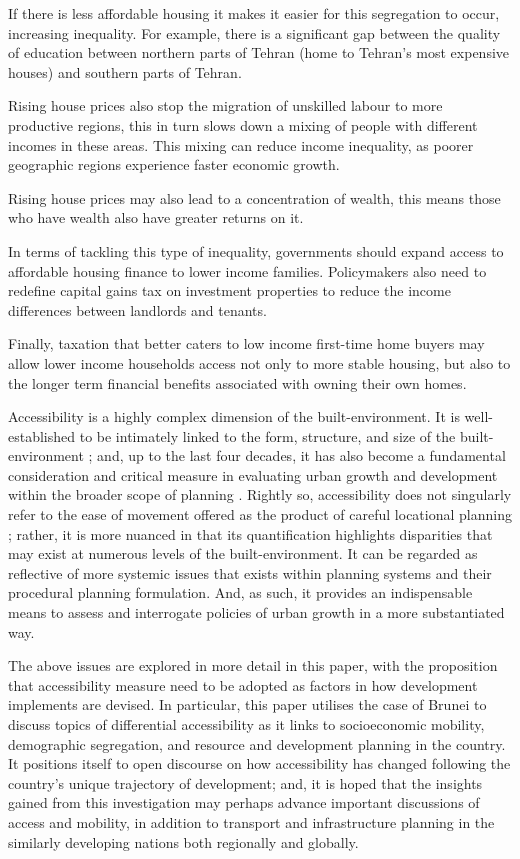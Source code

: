 If there is less affordable housing it makes it easier for this segregation to occur, increasing inequality. For example, there is a significant gap between the quality of education between northern parts of Tehran (home to Tehran’s most expensive houses) and southern parts of Tehran.

Rising house prices also stop the migration of unskilled labour to more productive regions, this in turn slows down a mixing of people with different incomes in these areas. This mixing can reduce income inequality, as poorer geographic regions experience faster economic growth.

Rising house prices may also lead to a concentration of wealth, this means those who have wealth also have greater returns on it.

In terms of tackling this type of inequality, governments should expand access to affordable housing finance to lower income families. Policymakers also need to redefine capital gains tax on investment properties to reduce the income differences between landlords and tenants.

Finally, taxation that better caters to low income first-time home buyers may allow lower income households access not only to more stable housing, but also to the longer term financial benefits associated with owning their own homes.


Accessibility is a highly complex dimension of the built-environment. It is well-established to be intimately linked to the form, structure, and size of the built-environment \citep{vickerman1974accessibility, handy1997measuring}; and, up to the last four decades, it has also become a fundamental consideration and critical measure in evaluating urban growth and development within the broader scope of planning \citep{ingram1971concept}. Rightly so, accessibility does not singularly refer to the ease of movement offered as the product of careful locational planning \citep{nelson1993assessing, gatrell1999health,van1999accessibility}; rather, it is more nuanced in that its quantification highlights disparities that may exist at numerous levels of the built-environment. It can be regarded as reflective of more systemic issues that exists within planning systems and their procedural planning formulation. And, as such, it provides an indispensable means to assess and interrogate policies of urban growth in a more substantiated way.

The above issues are explored in more detail in this paper, with the proposition that accessibility measure need to be adopted as factors in how development implements are devised. In particular, this paper utilises the case of Brunei to discuss topics of differential accessibility as it links to socioeconomic mobility, demographic segregation, and resource and development planning in the country. It positions itself to open discourse on how accessibility has changed following the country's unique trajectory of development; and, it is hoped that the insights gained from this investigation may perhaps advance important discussions of access and mobility, in addition to transport and infrastructure planning in the similarly developing nations both regionally and globally.

